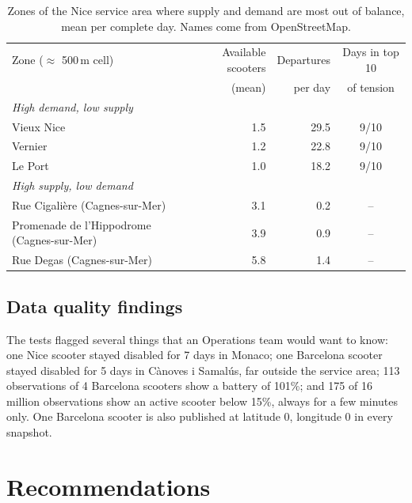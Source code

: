 \documentclass[11pt,a4paper]{article}
\begin{document}
\begin{table}[ht]
  \centering
  \small
  \begin{tabular}{lrrc}
    \toprule
    Zone ($\approx$ 500\,m cell) & Available scooters & Departures & Days in top 10 \\
                                 & (mean)             & per day    & of tension     \\
    \midrule
    \multicolumn{4}{l}{\emph{High demand, low supply}} \\
    \quad Vieux Nice & 1.5 & 29.5 & 9/10 \\
    \quad Vernier & 1.2 & 22.8 & 9/10 \\
    \quad Le Port & 1.0 & 18.2 & 9/10 \\
    \multicolumn{4}{l}{\emph{High supply, low demand}} \\
    \quad Rue Cigalière (Cagnes-sur-Mer) & 3.1 & 0.2 & -- \\
    \quad Promenade de l'Hippodrome (Cagnes-sur-Mer) & 3.9 & 0.9 & -- \\
    \quad Rue Degas (Cagnes-sur-Mer) & 5.8 & 1.4 & -- \\
    \bottomrule
  \end{tabular}
  \caption{Zones of the Nice service area where supply and demand are most out of balance, mean
  per complete day. Names come from OpenStreetMap.}
  \label{tab:zones}
\end{table}


\subsection{Data quality findings}
\label{sec:quality}

The tests flagged several things that an Operations team would want to know: one Nice scooter stayed disabled for 7 days in Monaco; one Barcelona scooter stayed disabled for 5 days in Cànoves i Samalús, far
outside the service area; 113 observations of 4 Barcelona scooters show a
battery of 101\%; and 175 of 16 million observations show an active scooter
below 15\%, always for a few minutes only. One Barcelona scooter is also published at latitude
0, longitude 0 in every snapshot.

\section{Recommendations}
\end{document}
